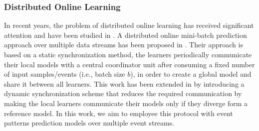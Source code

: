 
\subsubsection*{Distributed Online Learning}
\par In recent years, the problem of distributed online learning has received significant attention and have been studied in \cite{langford2009slow,yan2013distributed,xiao2010dual,dekel2012optimal,kamp2014communication}.  A distributed online mini-batch prediction approach over multiple data streams has been proposed in \cite{dekel2012optimal}. Their approach is based on a static synchronization method,  the learners periodically communicate  their local models with a central coordinator unit after consuming a fixed number of input samples/events (i.e., batch size $b$), in order to  create a global model and share it between all learners. This work has been extended in \cite{kamp2014communication} by introducing a
dynamic synchronization scheme that reduces the required communication by making the local learners communicate their models only if they diverge form a reference model. In this work, we aim to employee this protocol with event patterns prediction models over multiple event streams. 
